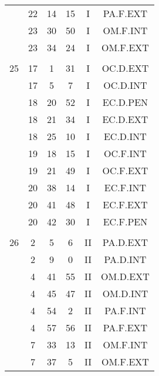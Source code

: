 \documentclass[12pt, a4paper]{article}
\begin{document}
\begin{multicols}{3}
{\begin{tabular}{c c c c c c}
	 	 	 	 & 22 & 14 & 15 & I & PA.F.EXT\\%
	 	 	 	 & 23 & 30 & 50 & I & OM.F.INT\\%
	 	 	 	 & 23 & 34 & 24 & I & OM.F.EXT\\%
	 	 	 	 & & & & & \\%
	 	 	 	25 & 17 & 1 & 31 & I & OC.D.EXT\\%
	 	 	 	 & 17 & 5 & 7 & I & OC.D.INT\\%
	 	 	 	 & 18 & 20 & 52 & I & EC.D.PEN\\%
	 	 	 	 & 18 & 21 & 34 & I & EC.D.EXT\\%
	 	 	 	 & 18 & 25 & 10 & I & EC.D.INT\\%
	 	 	 	 & 19 & 18 & 15 & I & OC.F.INT\\%
	 	 	 	 & 19 & 21 & 49 & I & OC.F.EXT\\%
	 	 	 	 & 20 & 38 & 14 & I & EC.F.INT\\%
	 	 	 	 & 20 & 41 & 48 & I & EC.F.EXT\\%
	 	 	 	 & 20 & 42 & 30 & I & EC.F.PEN\\%
	 	 	 	 & & & & & \\%
	 	 	 	26 & 2 & 5 & 6 & II & PA.D.EXT\\%
	 	 	 	 & 2 & 9 & 0 & II & PA.D.INT\\%
	 	 	 	 & 4 & 41 & 55 & II & OM.D.EXT\\%
	 	 	 	 & 4 & 45 & 47 & II & OM.D.INT\\%
	 	 	 	 & 4 & 54 & 2 & II & PA.F.INT\\%
	 	 	 	 & 4 & 57 & 56 & II & PA.F.EXT\\%
	 	 	 	 & 7 & 33 & 13 & II & OM.F.INT\\%
	 	 	 	 & 7 & 37 & 5 & II & OM.F.EXT\\%

\end{tabular}}
\end{multicols}
\end{document}
